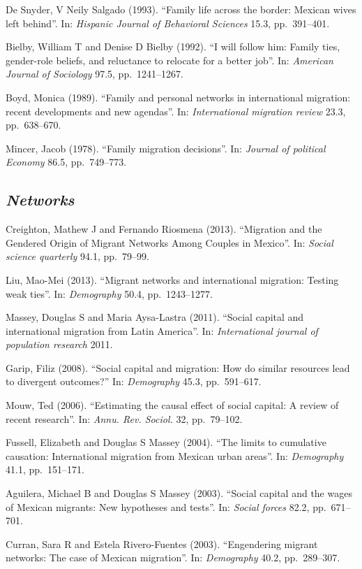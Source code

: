 \documentclass[
  12pt,
]{article}
\begin{document}
De Snyder, V Neily Salgado (1993). ``Family life across the border:
Mexican wives left behind''. In:
\emph{Hispanic Journal of Behavioral Sciences} 15.3, pp.~391--401.

Bielby, William T and Denise D Bielby (1992). ``I will follow him:
Family ties, gender-role beliefs, and reluctance to relocate for a
better job''. In: \emph{American Journal of Sociology} 97.5,
pp.~1241--1267.

Boyd, Monica (1989). ``Family and personal networks in international
migration: recent developments and new agendas''. In:
\emph{International migration review} 23.3, pp.~638--670.

Mincer, Jacob (1978). ``Family migration decisions''. In:
\emph{Journal of political Economy} 86.5, pp.~749--773.

\hypertarget{networks}{%
\subsection{\texorpdfstring{\emph{Networks}}{Networks}}\label{networks}}

Creighton, Mathew J and Fernando Riosmena (2013). ``Migration and the
Gendered Origin of Migrant Networks Among Couples in Mexico''. In:
\emph{Social science quarterly} 94.1, pp.~79--99.

Liu, Mao-Mei (2013). ``Migrant networks and international migration:
Testing weak ties''. In: \emph{Demography} 50.4, pp.~1243--1277.

Massey, Douglas S and Maria Aysa-Lastra (2011). ``Social capital and
international migration from Latin America''. In:
\emph{International journal of population research} 2011.

Garip, Filiz (2008). ``Social capital and migration: How do similar
resources lead to divergent outcomes?'' In: \emph{Demography} 45.3,
pp.~591--617.

Mouw, Ted (2006). ``Estimating the causal effect of social capital: A
review of recent research''. In: \emph{Annu. Rev. Sociol.} 32,
pp.~79--102.

Fussell, Elizabeth and Douglas S Massey (2004). ``The limits to
cumulative causation: International migration from Mexican urban
areas''. In: \emph{Demography} 41.1, pp.~151--171.

Aguilera, Michael B and Douglas S Massey (2003). ``Social capital and
the wages of Mexican migrants: New hypotheses and tests''. In:
\emph{Social forces} 82.2, pp.~671--701.

Curran, Sara R and Estela Rivero-Fuentes (2003). ``Engendering migrant
networks: The case of Mexican migration''. In: \emph{Demography} 40.2,
pp.~289--307.
\end{document}
